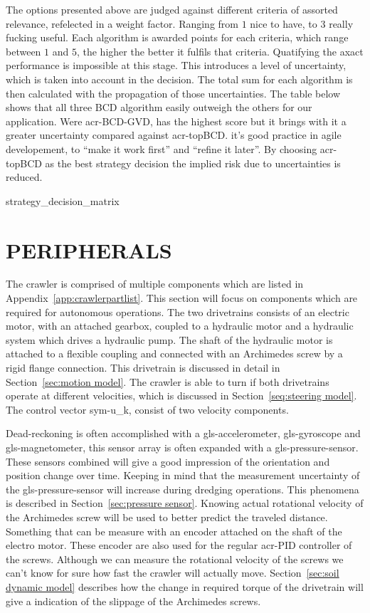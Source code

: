 The options presented above are judged against different criteria of assorted relevance, refelected in a weight factor.
Ranging from \( 1 \) nice to have, to \(  3 \) really fucking useful. Each algorithm is awarded points for each
criteria, which range between \( 1 \) and \( 5 \), the higher the better it fulfils that criteria. Quatifying the axact
performance is impossible at this stage. This introduces a level of uncertainty, which is taken into account in the
decision. The total sum for each algorithm is then calculated with the propagation of those uncertainties. The table
below shows that all three BCD algorithm easily outweigh the others for our application. Were \gls{acr-BCD-GVD}, has the
highest score but it brings with it a greater uncertainty compared against \gls{acr-topBCD}. it's good practice in
agile developement, to ``make it work first'' and ``refine it later''. By choosing \gls{acr-topBCD} as the best strategy
decision the implied risk due to uncertainties is reduced.

{strategy_decision_matrix}


\section{PERIPHERALS}\label{sec:peripherals}

The crawler is comprised of multiple components which are listed in Appendix~\ref{app:crawlerpartlist}. This section
will focus on components which are required for autonomous operations. The two drivetrains consists of an electric
motor, with an attached gearbox, coupled to a hydraulic motor and a hydraulic system which drives a hydraulic pump. The
shaft of the hydraulic motor is attached to a flexible coupling and connected with an Archimedes screw by a rigid flange
connection. This drivetrain is discussed in detail in Section~\ref{sec:motion model}. The crawler is able to turn if
both drivetrains operate at different velocities, which is discussed in Section~\ref{seq:steering model}. The control
vector \gls{sym-u_k}, consist of two velocity components.

Dead-reckoning is often accomplished with a \gls{gls-accelerometer}, \gls{gls-gyroscope} and \gls{gls-magnetometer},
this sensor array is often expanded with a \gls{gls-pressure-sensor}. These sensors combined will give a good impression
of the orientation and position change over time. Keeping in mind that the measurement uncertainty of the
\gls{gls-pressure-sensor} will increase during dredging operations. This phenomena is described in
Section~\ref{sec:pressure sensor}. Knowing actual rotational velocity of the Archimedes screw will be used to better
predict the traveled distance. Something that can be measure with an encoder attached on the shaft of the electro motor.
These encoder are also used for the regular \gls{acr-PID} controller of the screws. Although we can measure the
rotational velocity of the screws we can't know for sure how fast the crawler will actually move. Section~\ref{sec:soil
dynamic model} describes how the change in required torque of the drivetrain will give a indication of the slippage of
the Archimedes screws.


